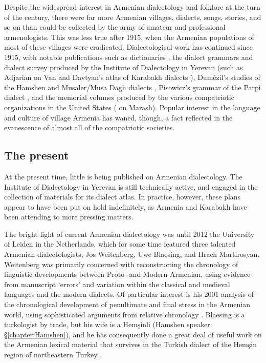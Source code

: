 \documentclass[output=paper]{langscibook}
\begin{document}
Despite the widespread interest in Armenian dialectology and folklore at the turn of the century, there were far more Armenian villages, dialects, songs, stories, and so on than could be collected by the army of amateur and professional armenologists. This was less true after 1915, when the Armenian populations of most of these villages were eradicated. Dialectological work has continued since 1915, with notable publications such as  dictionaries \citep{Malkhasiants-1944-ArmenianDictionary}, the dialect grammars and dialect survey produced by the Institute of Dialectology in Yerevan (such as Adjarian \citep{Adjarian-1952-VanDialect} on Van and Davtyan's  atlas of Karabakh dialects \citep{Davtyan-1966-KarabakhDialectMap}),  Dumézil's  studies of the Hamshen and Musaler/Musa Dagh dialects \citep{Dumezil-1964-NotesparlerarménienmusulmanHemşin,Dumezil-1965-NotesparlerarménienmusulmanArdala,Dumezil-1967-TroisrécitsdansparlerarméniensmusulmansHemşhin,Dumezil-1968-parlerarménienVakifliMusadaǧi,Dumezil-1986-romanpolicierarménienArdala},   Pisowicz's   grammar of the Parpi  dialect \citep{Pisowicz-1969-ParpiArmenian}, and the memorial volumes produced by the various compatriotic organizations in the United States (\citealt{Galustian-1934-MarashGermanikHerosZeytun} on Marash). Popular interest in the language and culture of village Armenia has waned, though, a fact reflected in the evanescence of almost all of the compatriotic societies.

\subsection{The present}\label{sec:vaux:dialectology:pres}

At the present time, little is being published on Armenian dialectology. The Institute of Dialectology in Yerevan is still technically active, and engaged in the collection of materials for its dialect atlas. In practice, however, these plans appear to have been put on hold indefinitely, as Armenia and Karabakh have been attending to more pressing matters. %

The bright light of current Armenian dialectology was until 2012 the University of Leiden in the Netherlands, which for some time featured three talented Armenian dialectologists, Jos Weitenberg, Uwe Blaesing, and Hrach Martirosyan. Weitenberg was primarily concerned with reconstructing the chronology of linguistic developments between Proto- and Modern Armenian, using evidence from manuscript `errors' and variation within the classical and medieval languages and the modern dialects. Of particular interest is his 2001 analysis of the chronological development of penultimate and final stress in the Armenian world, using sophisticated arguments from relative chronology \citep{Weitenberg-2001-ThoughtsearlyArmenianaccentuation}. Blaesing is a turkologist by trade, but his wife is a Hemşinli (Hamshen speaker: \S\ref{chapter:Hamshen}), and he has consequently done a great deal of useful work on the Armenian lexical material that survives in the Turkish dialect of the Hemşin region of northeastern Turkey \citep{Blasing-2003-aspectsArmenianTurkishlanguagecontactsHamshenarea}. 
\end{document}
